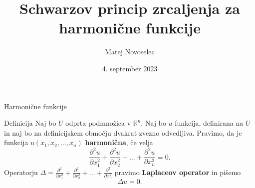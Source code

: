 \documentclass{beamer}
\title{Schwarzov princip zrcaljenja za harmonične funkcije}
\author{Matej Novoselec}
\institute[UL FMF]{FMF Fakulteta za matematiko in fiziko}
\date{4. september 2023}
\theoremstyle{definition}
\theoremstyle{definition}
\begin{document}
\begin{frame}
   \titlepage
\end{frame}
\begin{frame}{Harmonične funkcije}
    \begin{block}{Definicija}
        Naj bo $U$ odprta podmnožica v $\mathbb{R}^n$. Naj bo $u$ funkcija, definirana na $U$ in naj bo na definicijskem območju dvakrat zvezno odvedljiva.  
        Pravimo, da je funkcija $u(x_1, x_2, \dots, x_n)$ \textbf{harmonična}, če velja
        $$
        \frac{\partial^2 u}{\partial x_1 ^ 2} +  \frac{\partial^2 u}{\partial x_2 ^ 2} + \dots + \frac{\partial^2 u}{\partial x_n ^ 2} = 0.
        $$
        Operatorju $\Delta  = \frac{\partial^2}{\partial x_1 ^ 2} +  \frac{\partial^2}{\partial x_2 ^ 2} + \dots + \frac{\partial^2}{\partial x_n ^ 2}$ pravimo \textbf{Laplaceov operator} in pišemo
        $$
        \Delta u = 0.
        $$
    \end{block}
 \end{frame}
\end{document}
